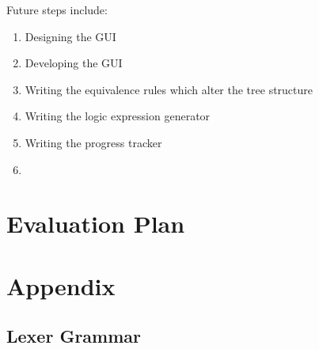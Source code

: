 \documentclass[12pt]{article}
\begin{document}
Future steps include:

\begin{enumerate}

	\item Designing the GUI

	\item Developing the GUI

	\item Writing the equivalence rules which alter the tree structure

	\item Writing the logic expression generator

	\item Writing the progress tracker

	\item  	

\end{enumerate}



\newpage




\section{Evaluation Plan}



\newpage



\section{Appendix}

\subsection{Lexer Grammar}
\end{document}
